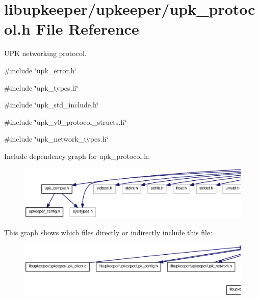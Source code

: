 \section{libupkeeper/upkeeper/upk\_\-protocol.h File Reference}
\label{upk__protocol_8h}


UPK networking protocol.  


{\ttfamily \#include \char`\"{}upk\_\-error.h\char`\"{}}\par
{\ttfamily \#include \char`\"{}upk\_\-types.h\char`\"{}}\par
{\ttfamily \#include \char`\"{}upk\_\-std\_\-include.h\char`\"{}}\par
{\ttfamily \#include \char`\"{}upk\_\-v0\_\-protocol\_\-structs.h\char`\"{}}\par
{\ttfamily \#include \char`\"{}upk\_\-network\_\-types.h\char`\"{}}\par
Include dependency graph for upk\_\-protocol.h:\nopagebreak
\begin{figure}[H]
\begin{center}
\leavevmode
\includegraphics[width=400pt]{upk__protocol_8h__incl}
\end{center}
\end{figure}
This graph shows which files directly or indirectly include this file:
\nopagebreak
\begin{figure}[H]
\begin{center}
\leavevmode
\includegraphics[width=400pt]{upk__protocol_8h__dep__incl}
\end{center}
\end{figure}
